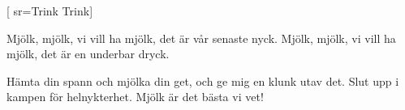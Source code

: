 


[ 	%
	sr={Trink Trink}]	%
	
\beginverse*		%
Mjölk, mjölk, vi vill ha mjölk,
det är vår senaste nyck.
Mjölk, mjölk, vi vill ha mjölk,
det är en underbar dryck.
\endverse			%

\beginverse*		%
Hämta din spann och mjölka din get,
och ge mig en klunk utav det.
Slut upp i kampen för helnykterhet.
Mjölk är det bästa vi vet!
\endverse			%
\endsong			%
